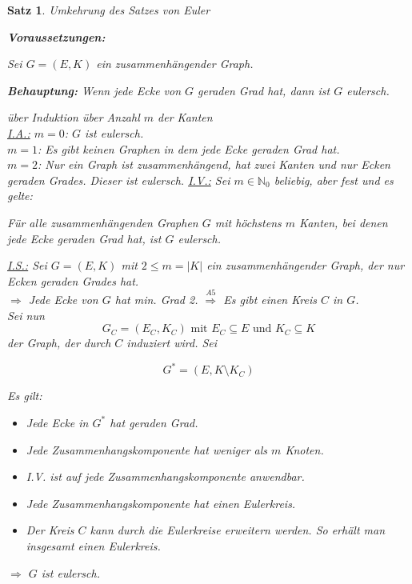 \documentclass[a4paper,9pt]{scrartcl}
\newlength\Thmindent
\newenvironment{precondition}
  {\par\medskip\adjustwidth{\Thmindent}{}\normalfont\textbf{Voraussetzungen:}\par\nobreak}
  {\endadjustwidth}
\newenvironment{claim}
  {\par\medskip\adjustwidth{\Thmindent}{}\normalfont\textbf{Behauptung:}}
  {\endadjustwidth}
\theoremstyle{plain}
\newtheorem{theorem}{Satz}
\newcommand{\cmark}{\ding{51}}%
\begin{document}
\begin{theorem}{Umkehrung des Satzes von Euler}
    ~~~
    \begin{precondition}
        Sei $G = (E, K)$ ein zusammenhängender Graph.
    \end{precondition}
    \begin{claim}
        Wenn jede Ecke von $G$ geraden Grad hat, dann ist $G$ eulersch.
    \end{claim}
    \begin{Proof} über Induktion über Anzahl $m$ der Kanten\\
        \underline{I.A.:} $m=0$: $G$ ist eulersch. \cmark\\
        $m=1$: Es gibt keinen Graphen in dem jede Ecke geraden Grad hat. \cmark\\
        $m=2$: Nur ein Graph ist zusammenhängend, hat zwei Kanten und nur Ecken geraden Grades. Dieser ist eulersch. \cmark
        \goodbreak
        \underline{I.V.:} Sei $m \in \mathbb{N}_0$ beliebig, aber fest und 
        es gelte: 

        Für alle zusammenhängenden Graphen $G$ mit höchstens $m$ Kanten, bei denen jede Ecke geraden Grad hat, ist $G$ eulersch.

        \underline{I.S.:} Sei $G=(E,K)$ mit $2 \leq m  = |K|$ ein zusammenhängender Graph, der nur Ecken geraden Grades hat.\\
        $\Rightarrow$ Jede Ecke von $G$ hat min. Grad 2.
        $\stackrel{A5}{\Rightarrow}$ Es gibt einen Kreis $C$ in $G$.\\

        Sei nun 
            \[G_C = (E_C, K_C) \text{ mit } E_C \subseteq E \text{ und } K_C \subseteq K \]
        der Graph, der durch $C$ induziert wird.
        Sei 

            \[ G^* = (E, K \setminus K_C) \]

        Es gilt: 
        \begin{itemize}
            \item Jede Ecke in $G^*$ hat geraden Grad.
            \item Jede Zusammenhangskomponente hat weniger als $m$ Knoten.
            \item[$\Rightarrow$] I.V. ist auf jede Zusammenhangskomponente anwendbar.
            \item[$\Rightarrow$] Jede Zusammenhangskomponente hat einen Eulerkreis.
            \item[$\Rightarrow$] Der Kreis $C$ kann durch die Eulerkreise erweitern werden. So erhält man insgesamt einen Eulerkreis.
        \end{itemize}
        $\Rightarrow$ $G$ ist eulersch.
    \end{Proof}
\end{theorem}
\vspace{0.5cm}
\end{document}
